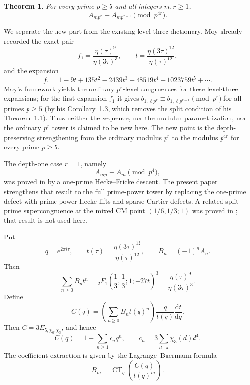 \documentclass[11pt]{amsart}
\newtheorem{theorem}{Theorem}[section]
\theoremstyle{remark}
\DeclareMathOperator{\CT}{CT}
\newcommand{\dd}{\mathrm d}
\begin{document}
\begin{theorem}\label{thm:main-intro}
For every prime $p\ge5$ and all integers $m,r\ge1$,
\[
 A_{mp^r}\equiv A_{mp^{r-1}}\pmod {p^{4r}}.
\]
\end{theorem}

We separate the new part from the existing level-three dictionary.  Moy \cite[Section 5.2]{Moy} already recorded the exact pair
\[
 f_1=\frac{\eta(\tau)^9}{\eta(3\tau)^3},\qquad
 t=\frac{\eta(3\tau)^{12}}{\eta(\tau)^{12}},
\]
and the expansion
\[
 f_1=1-9t+135t^2-2439t^3+48519t^4-1023759t^5+\cdots .
\]
Moy's framework yields the ordinary $p^r$-level congruences for these level-three expansions; for the first expansion $f_1$ it gives $b_{1,\ell p^r}\equiv b_{1,\ell p^{r-1}}\pmod{p^r}$ for all primes $p\ge5$ (by his Corollary~1.3, which removes the split condition of his Theorem~1.1).  Thus neither the sequence, nor the modular parametrization, nor the ordinary $p^r$ tower is claimed to be new here.  The new point is the depth-preserving strengthening from the ordinary modulus $p^r$ to the modulus $p^{4r}$ for every prime $p\ge5$.

The depth-one case $r=1$, namely
\[
 A_{mp}\equiv A_m\pmod {p^4},
\]
was proved in \cite{ShvetsP4} by a one-prime Hecke--Fricke descent.  The present paper strengthens that result to the full prime-power tower by replacing the one-prime defect with prime-power Hecke lifts and sparse Cartier defects.  A related split-prime supercongruence at the mixed CM point $(1/6,1/3;1)$ was proved in \cite{ShvetsMixed}; that result is not used here.

Put
\[
 q=e^{2\pi i\tau},\qquad
 t(\tau)=\frac{\eta(3\tau)^{12}}{\eta(\tau)^{12}},
 \qquad
 B_n=(-1)^nA_n.
\]
Then
\[
 \sum_{n\ge0}B_nt^n
 ={}_2F_1\!\left(\frac13,\frac13;1;-27t\right)^3
 =\frac{\eta(\tau)^9}{\eta(3\tau)^3}.
\]
Define
\[
 C(q)=\left(\sum_{n\ge0}B_nt(q)^n\right)\frac{q}{t(q)}\frac{\dd t}{\dd q}.
\]
Then $C=3E_{5,\chi_0,\chi_3}$, and hence
\[
 C(q)=1+\sum_{n\ge1}c_nq^n,
 \qquad
 c_n=3\sum_{d\mid n}\chi_3(d)d^4.
\]
The coefficient extraction is given by the Lagrange--Buermann formula
\[
 B_m=\CT_q\left(\frac{C(q)}{t(q)^m}\right).
\]
\end{document}
